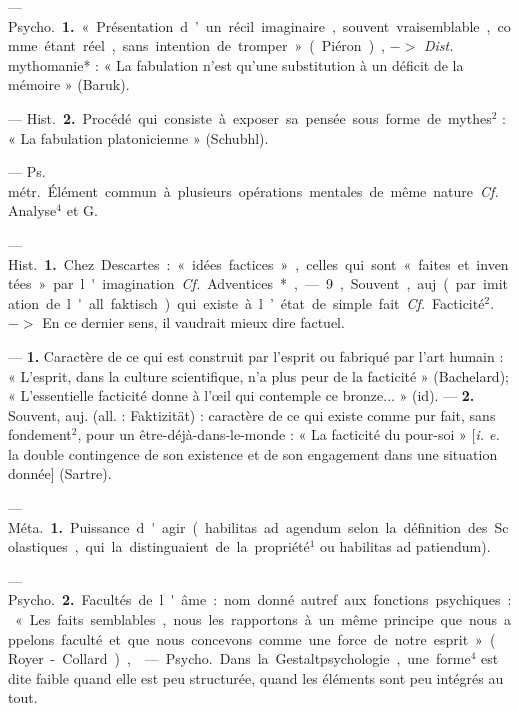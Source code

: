 
	\begin{itemize}[leftmargin=1cm, label=, itemsep=1pt]

 — \si{Psycho.} {\bf 1.} « Présentation d’un récil imaginaire, souvent vraisemblable, comme étant
réel, sans intention de tromper »
(Piéron), $->$ {\it Dist.} mythomanie* :
« La fabulation n’est qu’une substitution à un déficit de la mémoire »
(Baruk).

— \si{Hist.} {\bf 2.} Procédé qui consiste
à exposer sa pensée sous forme de
mythes$^2$ : « La fabulation platonicienne » (Schubhl).

 — \si{Ps. métr.} Élément commun
à plusieurs opérations mentales de
même nature. {\it Cf.} Analyse$^4$ et G.

 — \si{Hist.} {\bf 1.} Chez Descartes :
« idées factices », celles qui sont
« faites et inventées » par l'imagination. {\it Cf.} Adventices*, — 9, Souvent, auj. (par imitation de l'all.
faktisch) qui existe à l’état de
simple fait. {\it Cf.} Facticité$^2$. $->$ En
ce dernier sens, il vaudrait mieux
dire factuel.

 — {\bf 1.} Caractère de ce qui
est construit par l'esprit ou fabriqué
par l'art humain : « L'esprit, dans
la culture scientifique, n’a plus peur
de la facticité » (Bachelard); « L’essentielle facticité donne à l’œil qui
contemple ce bronze... » (id). —
 {\bf 2.} Souvent, auj. (all. : Faktizität) :
caractère de ce qui existe comme
pur fait, sans fondement$^2$, pour un
être-déjà-dans-le-monde : « La facticité du pour-soi » [{\it i. e.} la double
contingence de son existence et de
son engagement dans une situation
donnée] (Sartre).

 — \si{Méta.} {\bf 1.} Puissance d'agir
(habilitas ad agendum selon la définition des Scolastiques, qui la distinguaient de la propriété$^1$ ou habilitas ad patiendum).

— \si{Psycho.} {\bf 2.} Facultés de l'âme :
nom donné autref. aux fonctions
psychiques : « Les faits semblables,
nous les rapportons à un même
principe que nous appelons faculté et
que nous concevons comme une force
de notre esprit » (Royer-Collard),

 — \si{Psycho.} Dans la Gestaltpsychologie, une forme$^4$ est dite
faible quand elle est peu structurée,
quand les éléments sont peu intégrés au tout.


\end{itemize}
